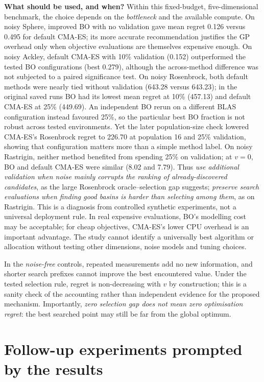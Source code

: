 \documentclass[11pt,a4paper]{article}
\begin{document}
\textbf{What should be used, and when?} Within this fixed-budget, five-dimensional benchmark, the choice depends on the \emph{bottleneck} and the available compute. On noisy Sphere, improved BO with no validation gave mean regret 0.126 versus 0.495 for default CMA-ES; its more accurate recommendation justifies the GP overhead only when objective evaluations are themselves expensive enough. On noisy Ackley, default CMA-ES with 10\% validation (0.152) outperformed the tested BO configurations (best 0.279), although the across-method difference was not subjected to a paired significance test. On noisy Rosenbrock, both default methods were nearly tied without validation (643.28 versus 643.23); in the original saved runs BO had its lowest mean regret at 10\% (457.13) and default CMA-ES at 25\% (449.69). An independent BO rerun on a different BLAS configuration instead favoured 25\%, so the particular best BO fraction is not robust across tested environments. Yet the later population-size check lowered CMA-ES's Rosenbrock regret to 226.70 at population 16 and 25\% validation, showing that configuration matters more than a simple method label. On noisy Rastrigin, neither method benefited from spending 25\% on validation; at $v=0$, BO and default CMA-ES were similar (8.02 and 7.79). Thus \emph{use additional validation when noise mainly corrupts the ranking of already-discovered candidates}, as the large Rosenbrock oracle--selection gap suggests; \emph{preserve search evaluations when finding good basins is harder than selecting among them}, as on Rastrigin. This is a diagnosis from controlled synthetic experiments, not a universal deployment rule. In real expensive evaluations, BO's modelling cost may be acceptable; for cheap objectives, CMA-ES's lower CPU overhead is an important advantage. The study cannot identify a universally best algorithm or allocation without testing other dimensions, noise models and tuning choices.

In the \emph{noise-free} controls, repeated measurements add no new information, and shorter search prefixes cannot improve the best encountered value. Under the tested selection rule, regret is non-decreasing with $v$ by construction; this is a sanity check of the accounting rather than independent evidence for the proposed mechanism. Importantly, \emph{zero selection gap does not mean zero optimisation regret}: the best searched point may still be far from the global optimum.

\section{Follow-up experiments prompted by the results}
\end{document}

